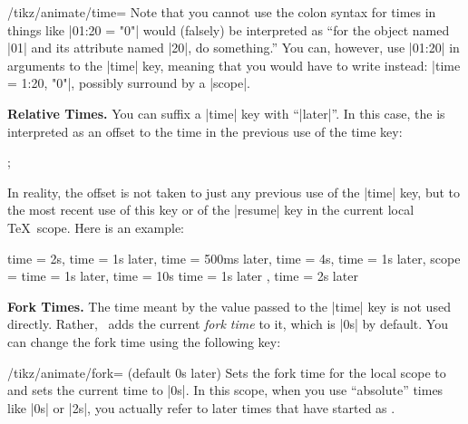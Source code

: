 \begin{key}{/tikz/animate/time=}
  Note that you cannot use the colon syntax for times in things like
  |01:20 = "0"| would (falsely) be interpreted as ``for the object named
  |01| and its attribute named |20|, do something.'' You can, however,
  use |01:20| in arguments to the |time| key, meaning that you would
  have to write instead: |time = 1:20, "0"|, possibly surround by a
  |scope|. 

  \medskip\textbf{Relative Times.}
  You can suffix a |time| key with ``|later|''. In this case, the
   is interpreted as an offset to the time in the previous
  use of the time key:

\begin{codeexample}[animation list={0.5,1,1.5,2}]
\tikz {};
\end{codeexample}

  In reality, the offset is not taken to just any previous use of the
  |time| key, but to the most recent use of this key or of the
  |resume| key in the current local \TeX\ scope. Here is an example:
\begin{codeexample}
time = 2s,
time = 1s later,    %
time = 500ms later, %
time = 4s,
time = 1s later,    %
scope = {           %
  time = 1s later,  %
  time = 10s
  time = 1s later   %
},                  %
time = 2s later     %
\end{codeexample}

  \medskip\textbf{Fork Times.}
  The time meant by the value  passed to the |time| key is
  not used directly. Rather, \tikzname\ adds the current \emph{fork
    time} to it, which is |0s| by default. You can change the fork
  time using the following key:
  \begin{key}{/tikz/animate/fork= (default 0s later)}
    Sets the fork time for the local scope to  and sets the
    current time to |0s|. In this scope, when you use ``absolute''
    times like |0s| or |2s|, you actually refer to later times that
    have started as . 


\end{key}
\end{key}
